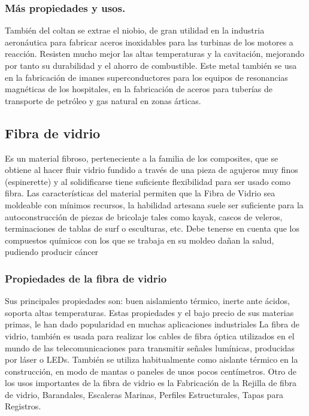 \documentclass[../main]{subfiles}
\begin{document}
\subsubsection{Más propiedades y usos.}

También del coltan se extrae el niobio, de gran utilidad en la
industria aeronáutica para fabricar aceros inoxidables para las
turbinas de los motores a reacción. Resisten mucho mejor las altas
temperaturas y la cavitación, mejorando por tanto su durabilidad y el
ahorro de combustible.
Este metal también se usa en la fabricación de imanes
superconductores para los equipos de resonancias magnéticas de los
hospitales, en la fabricación de aceros para tuberías de transporte
de petróleo y gas natural en zonas árticas.

\subsection{Fibra de vidrio}
Es un material fibroso, perteneciente a la familia de los composites,
que se obtiene al hacer fluir vidrio fundido a través de una pieza de
agujeros muy finos (espinerette) y al solidificarse tiene suficiente
flexibilidad para ser usado como fibra.
Las características del material permiten que la Fibra de Vidrio sea
moldeable con mínimos recursos, la habilidad artesana suele ser
suficiente para la autoconstrucción de piezas de bricolaje tales como
kayak, cascos de veleros, terminaciones de tablas de surf o
esculturas, etc. Debe tenerse en cuenta que los compuestos químicos
con los que se trabaja en su moldeo dañan la salud, pudiendo producir cáncer

\subsubsection{Propiedades de la fibra de vidrio}
Sus principales propiedades son: buen aislamiento térmico, inerte
ante ácidos, soporta altas temperaturas. Estas propiedades y el bajo
precio de sus materias primas, le han dado popularidad en muchas
aplicaciones industriales
La fibra de vidrio, también es usada para realizar los cables de
fibra óptica utilizados en el mundo de las telecomunicaciones para
transmitir señales lumínicas, producidas por láser o LEDs. También se
utiliza habitualmente como aislante térmico en la construcción, en
modo de mantas o paneles de unos pocos centímetros.
Otro de los usos importantes de la fibra de vidrio es la Fabricación
de la Rejilla de fibra de vidrio, Barandales, Escaleras Marinas,
Perfiles Estructurales, Tapas para Registros.
\end{document}
